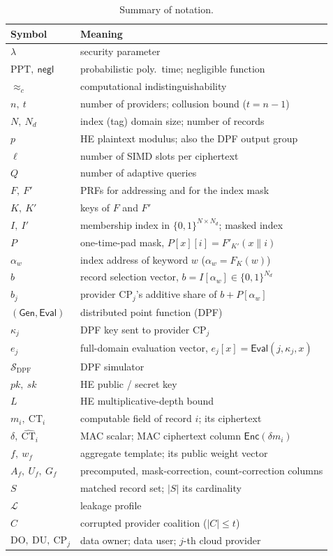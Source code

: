\documentclass[journal]{IEEEtran}
\newcommand{\negl}{\mathsf{negl}}
\newcommand{\PPT}{\mathrm{PPT}}
\newcommand{\Leak}{\mathcal{L}}
\newcommand{\Sim}{\mathcal{S}}
\newcommand{\cind}{\approx_c}
\newcommand{\Gen}{\mathsf{Gen}}
\newcommand{\Eval}{\mathsf{Eval}}
\newcommand{\Enc}{\mathsf{Enc}}
\begin{document}
\begin{table}[t]
\centering
\caption{Summary of notation.}
\label{tab:notation}
\footnotesize
\begin{tabular}{@{}ll@{}}
\toprule
Symbol & Meaning \\
\midrule
$\lambda$ & security parameter \\
$\PPT,\ \negl$ & probabilistic poly.\ time; negligible function \\
$\cind$ & computational indistinguishability \\
$n,\ t$ & number of providers; collusion bound ($t=n-1$) \\
$N,\ N_d$ & index (tag) domain size; number of records \\
$p$ & HE plaintext modulus; also the DPF output group \\
$\ell$ & number of SIMD slots per ciphertext \\
$Q$ & number of adaptive queries \\
$F,\ F'$ & PRFs for addressing and for the index mask \\
$K,\ K'$ & keys of $F$ and $F'$ \\
$I,\ I'$ & membership index in $\{0,1\}^{N\times N_d}$; masked index \\
$P$ & one-time-pad mask, $P[x][i]=F'_{K'}(x\|i)$ \\
$\alpha_w$ & index address of keyword $w$ ($\alpha_w=F_K(w)$) \\
$b$ & record selection vector, $b=I[\alpha_w]\in\{0,1\}^{N_d}$ \\
$b_j$ & provider $\text{CP}_j$'s additive share of $b+P[\alpha_w]$ \\
$(\Gen,\Eval)$ & distributed point function (DPF) \\
$\kappa_j$ & DPF key sent to provider $\text{CP}_j$ \\
$e_j$ & full-domain evaluation vector, $e_j[x]=\Eval(j,\kappa_j,x)$ \\
$\Sim_{\mathrm{DPF}}$ & DPF simulator \\
$pk,\ sk$ & HE public / secret key \\
$L$ & HE multiplicative-depth bound \\
$m_i,\ \text{CT}_i$ & computable field of record $i$; its ciphertext \\
$\delta,\ \widehat{\text{CT}}_i$ & MAC scalar; MAC ciphertext column $\Enc(\delta m_i)$ \\
$f,\ w_f$ & aggregate template; its public weight vector \\
$A_f,\ U_f,\ G_f$ & precomputed, mask-correction, count-correction columns \\
$S$ & matched record set; $|S|$ its cardinality \\
$\Leak$ & leakage profile \\
$C$ & corrupted provider coalition ($|C|\le t$) \\
$\mathrm{DO,\ DU},\ \text{CP}_j$ & data owner; data user; $j$-th cloud provider \\
\bottomrule
\end{tabular}
\end{table}
\end{document}
